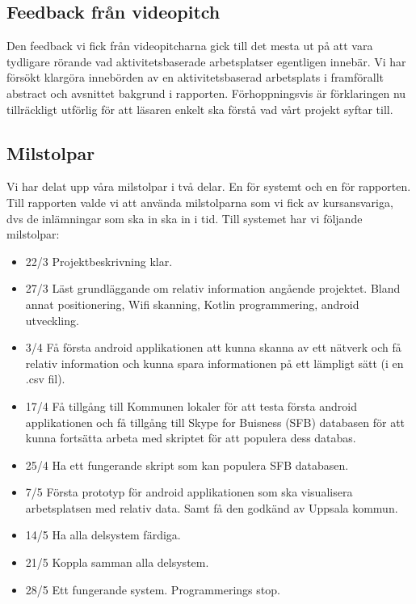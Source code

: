 \documentclass[swedish, a4paper,12pt]{article}
\begin{document}
\subsection{Feedback från videopitch}
Den feedback vi fick från videopitcharna gick till det mesta ut på att vara tydligare rörande vad aktivitetsbaserade arbetsplatser egentligen innebär.
Vi har försökt klargöra innebörden av en aktivitetsbaserad arbetsplats i framförallt abstract och avsnittet bakgrund i rapporten. Förhoppningsvis är förklaringen nu tillräckligt utförlig för att läsaren enkelt ska förstå vad vårt projekt syftar till.


\subsection{Milstolpar}
Vi har delat upp våra milstolpar i två delar. En för systemt och en för rapporten. Till rapporten valde vi att använda milstolparna som vi fick av kursansvariga, dvs de inlämningar som ska in ska in i tid. Till systemet har vi följande milstolpar:
\begin{itemize}
	\item 22/3 Projektbeskrivning klar.
	\item 27/3 Läst grundläggande om relativ information angående projektet. Bland annat positionering, Wifi skanning, Kotlin programmering, android utveckling.
	\item 3/4 Få första android applikationen att kunna skanna av ett nätverk och få relativ information och kunna spara informationen på ett lämpligt sätt (i en .csv fil).
	\item 17/4 Få tillgång till Kommunen lokaler för att testa första android applikationen och få tillgång till Skype for Buisness (SFB) databasen för att kunna fortsätta arbeta med skriptet för att populera dess databas.
 	\item 25/4 Ha ett fungerande skript som kan populera  SFB databasen.
	\item 7/5 Första prototyp för android applikationen som ska visualisera arbetsplatsen med relativ data. Samt få den godkänd av Uppsala kommun.
	\item 14/5 Ha alla delsystem färdiga.
	\item 21/5 Koppla samman alla delsystem.
	\item 28/5 Ett fungerande system. Programmerings stop.
\end{itemize}

\end{document}
